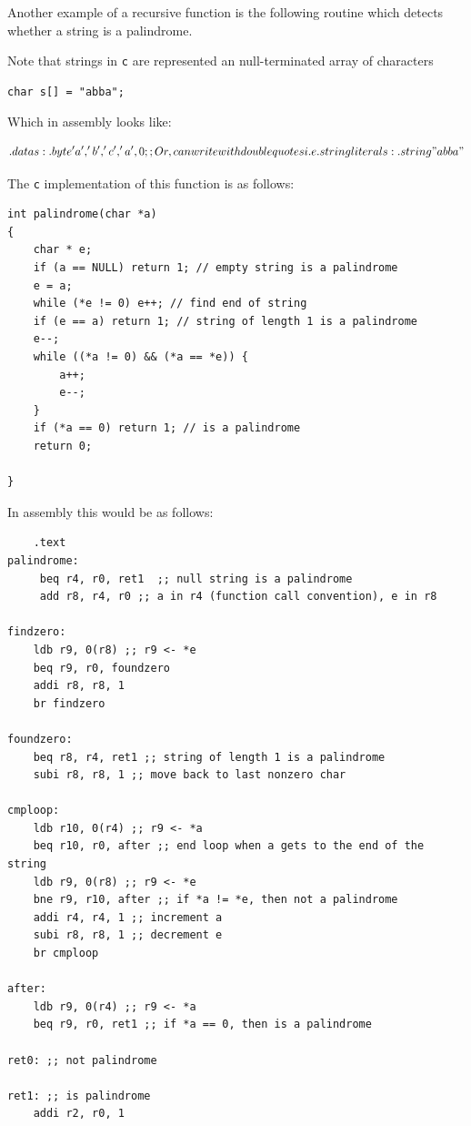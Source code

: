 \documentclass[../notes.tex]{subfiles}
\begin{document}
Another example of a recursive function is the following routine which detects whether a string is a palindrome.


Note that strings in \texttt{c} are represented an null-terminated array of characters 
\begin{listing}[H]
\begin{verbatim}
char s[] = "abba";
\end{verbatim}
\end{listing}

Which in assembly looks like:

\begin{equation}
	.data
	s: .byte 'a', 'b', 'c', 'a', 0
	;; Or, can write with double quotes i.e. string literal
	s: .string "abba"
\end{equation}

The \texttt{c} implementation of this function is as follows:

\begin{listing}[H]
\begin{verbatim}
int palindrome(char *a)
{
	char * e;
	if (a == NULL) return 1; // empty string is a palindrome
	e = a;
	while (*e != 0) e++; // find end of string
	if (e == a) return 1; // string of length 1 is a palindrome
	e--;
	while ((*a != 0) && (*a == *e)) {
		a++;
		e--;
	}
	if (*a == 0) return 1; // is a palindrome
	return 0;

}
\end{verbatim}
\end{listing}

In assembly this would be as follows:


\begin{listing}[H]
\begin{verbatim}
	.text
palindrome:
	 beq r4, r0, ret1  ;; null string is a palindrome
	 add r8, r4, r0 ;; a in r4 (function call convention), e in r8

findzero:
	ldb r9, 0(r8) ;; r9 <- *e
	beq r9, r0, foundzero
	addi r8, r8, 1
	br findzero

foundzero:
	beq r8, r4, ret1 ;; string of length 1 is a palindrome
	subi r8, r8, 1 ;; move back to last nonzero char

cmploop:
	ldb r10, 0(r4) ;; r9 <- *a
	beq r10, r0, after ;; end loop when a gets to the end of the string
	ldb r9, 0(r8) ;; r9 <- *e
	bne r9, r10, after ;; if *a != *e, then not a palindrome
	addi r4, r4, 1 ;; increment a
	subi r8, r8, 1 ;; decrement e
	br cmploop

after:
	ldb r9, 0(r4) ;; r9 <- *a
	beq r9, r0, ret1 ;; if *a == 0, then is a palindrome

ret0: ;; not palindrome

ret1: ;; is palindrome
	addi r2, r0, 1

\end{verbatim}
\end{listing}
\end{document}
